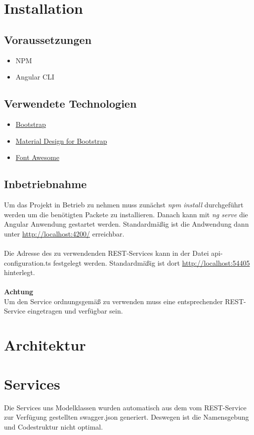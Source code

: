 \documentclass[10pt,a4paper,margin=0pt]{scrartcl}
\begin{document}
\fontsize{10pt}{24pt}\selectfont

\section{Installation}
\subsection{Voraussetzungen}
\begin{itemize}
	\item NPM
	\item Angular CLI
\end{itemize}
\subsection{Verwendete Technologien}
\begin{itemize}
	\item \href{https://getbootstrap.com/}{Bootstrap}
	\item \href{https://mdbootstrap.com/docs/angular/>}{Material Design for Bootstrap}
	\item \href{https://fontawesome.com//}{Font Awesome}
\end{itemize}
\subsection{Inbetriebnahme}
Um das Projekt in Betrieb zu nehmen muss zunächst \textit{npm install} durchgeführt werden um die benötigten Packete zu installieren. Danach kann mit \textit{ng serve} die Angular Anwendung gestartet werden. Standardmäßig ist die Andwendung dann unter \url{http://localhost:4200/} erreichbar.\\\\
Die Adresse des zu verwendenden REST-Services kann in der Datei api-configuration.ts festgelegt werden. Standardmäßig ist dort \url{http://localhost:54405} hinterlegt.\\\\
\textbf{Achtung}\\
Um den Service ordnungsgemäß zu verwenden muss eine entsprechender REST-Service eingetragen und verfügbar sein.
\pagebreak
\section{Architektur}
\pagebreak
\section{Services}
Die Services uns Modelklassen wurden automatisch aus dem vom REST-Service zur Verfügung gestellten swagger.json generiert. Deswegen ist die Namensgebung und Codestruktur nicht optimal.
\end{document}
